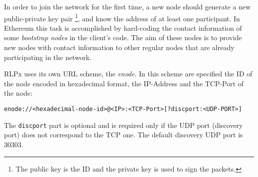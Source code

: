 In order to join the network for the first time, a new node should generate a
new public-private key pair \footnote{The public key is the ID and the private
key is used to sign the packets.}, and know the address of at least one
participant. In Ethereum this task is accomplished by hard-coding the contact
information of some \textit{bootstrap nodes} in the client's code. The aim of
these nodes is to provide new nodes with contact information to other regular
nodes that are already participating in the network.

RLPx uses its own URL scheme, the \emph{enode}. In this scheme are specified the ID
of the node encoded in hexadecimal format, the IP-Address and the TCP-Port of
the node:
\begin{verbatim}
enode://<hexadecimal-node-id>@<IP>:<TCP-Port>[?discport:<UDP-PORT>]
\end{verbatim}
The \verb|discport| part is optional and is required only if the UDP port
(discovery port) does not correspond to the TCP one. The default discovery UDP
port is 30303.

